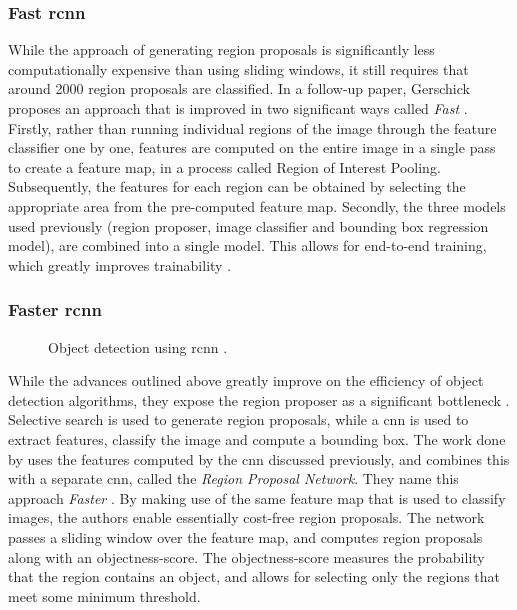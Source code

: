 \documentclass[\rootfolder/main.tex]{subfiles}
\begin{document}
\subsubsection{Fast \acrshort{rcnn}}

While the approach of generating region proposals is significantly less computationally expensive than using sliding windows, it still requires that around 2000 region proposals are classified.
In a follow-up paper, Gerschick proposes an approach that is improved in two significant ways called \emph{Fast }.
Firstly, rather than running individual regions of the image through the feature classifier one by one, features are computed on the entire image in a single pass to create a feature map, in a process called Region of Interest Pooling.
Subsequently, the features for each region can be obtained by selecting the appropriate area from the pre-computed feature map.
Secondly, the three models used previously (region proposer, image classifier and bounding box regression model), are combined into a single model.
This allows for end-to-end training, which greatly improves trainability \cite{Girshick2015}.

\subsubsection{Faster \acrshort{rcnn}}

\begin{wrapfigure}{r}{0.4\columnwidth}
    \caption[Object detection using Faster \acrshort{rcnn}.]{Object detection using \acrshort{rcnn} \cite{Ren2017}.}
    \label{fig:faster-rcnn}
\end{wrapfigure}

While the advances outlined above greatly improve on the efficiency of object detection algorithms, they expose the region proposer as a significant bottleneck \cite{Ren2017}.
Selective search is used to generate region proposals, while a \acrshort{cnn} is used to extract features, classify the image and compute a bounding box.
The work done by \cite{Ren2017} uses the features computed by the \acrshort{cnn} discussed previously, and combines this with a separate \acrshort{cnn}, called the \emph{Region Proposal Network}.
They name this approach \emph{Faster }.
By making use of the same feature map that is used to classify images, the authors enable essentially cost-free region proposals.
The network passes a sliding window over the feature map, and computes region proposals along with an objectness-score.
The objectness-score measures the probability that the region contains an object, and allows for selecting only the regions that meet some minimum threshold.
\end{document}
